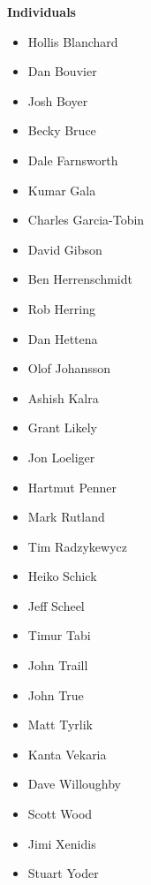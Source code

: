 \documentclass[a4paper,10pt,oneside]{sphinxmanual}
\begin{document}
\textbf{Individuals}
\begin{itemize}\setlength{\itemsep}{0pt}\setlength{\parskip}{0pt}
\item {} 
Hollis Blanchard

\item {} 
Dan Bouvier

\item {} 
Josh Boyer

\item {} 
Becky Bruce

\item {} 
Dale Farnsworth

\item {} 
Kumar Gala

\item {} 
Charles Garcia-Tobin

\item {} 
David Gibson

\item {} 
Ben Herrenschmidt

\item {} 
Rob Herring

\item {} 
Dan Hettena

\item {} 
Olof Johansson

\item {} 
Ashish Kalra

\item {} 
Grant Likely

\item {} 
Jon Loeliger

\item {} 
Hartmut Penner

\item {} 
Mark Rutland

\item {} 
Tim Radzykewycz

\item {} 
Heiko Schick

\item {} 
Jeff Scheel

\item {} 
Timur Tabi

\item {} 
John Traill

\item {} 
John True

\item {} 
Matt Tyrlik

\item {} 
Kanta Vekaria

\item {} 
Dave Willoughby

\item {} 
Scott Wood

\item {} 
Jimi Xenidis

\item {} 
Stuart Yoder

\end{itemize}
\end{document}
